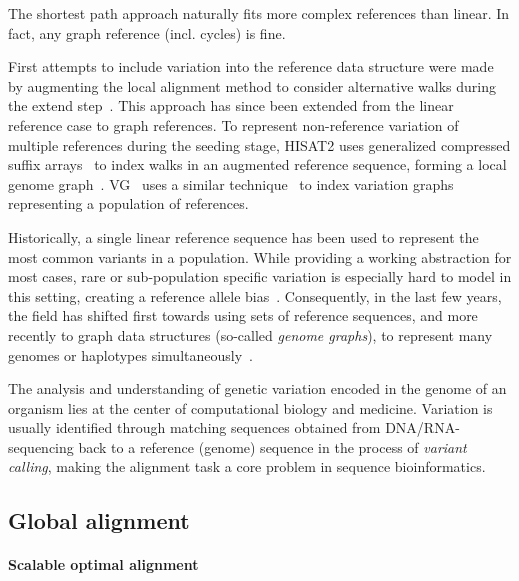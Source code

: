 The shortest path approach naturally fits more complex references than linear.
In fact, any graph reference (incl. cycles) is fine.

First attempts to include variation into the reference data structure were made
by augmenting the local alignment method to consider alternative walks during the
extend step~\cite{schneeberger_simultaneous_2009,palmapper}. This approach has
since been extended from the linear reference case to graph references. To
represent non-reference variation of multiple references during the seeding
stage, HISAT2 uses generalized compressed suffix
arrays~\cite{siren_indexing_2014} to index walks in an augmented reference
sequence, forming a local genome graph~\cite{kim_graphbased_2019}.
VG~\cite{garrison_variation_2018} uses a similar
technique~\cite{siren_indexing_2017} to index variation graphs representing a
population of references.

Historically, a single linear reference sequence has been used to represent the
most common variants in a population. While providing a working abstraction for
most cases, rare or sub-population specific variation is especially hard to
model in this setting, creating a reference allele
bias~\cite{stevenson_sources_2013,brandt_mapping_2015}. Consequently, in the
last few years, the field has shifted first towards using sets of reference
sequences, and more recently to graph data structures (so-called {\em genome
graphs}), to represent many genomes or haplotypes
simultaneously~\cite{dilthey_improved_2015,paten_genome_2017,garrison_variation_2018}.

The analysis and understanding of genetic variation encoded in the genome of an
organism lies at the center of computational biology and medicine. Variation is
usually identified through matching sequences obtained from DNA/RNA-sequencing
back to a reference (genome) sequence in the process of \emph{variant calling},
making the alignment task a core problem in sequence bioinformatics.

\subsection*{Global alignment}
%

\label{TRIEsec:task}

\paragraph{Scalable optimal alignment}
